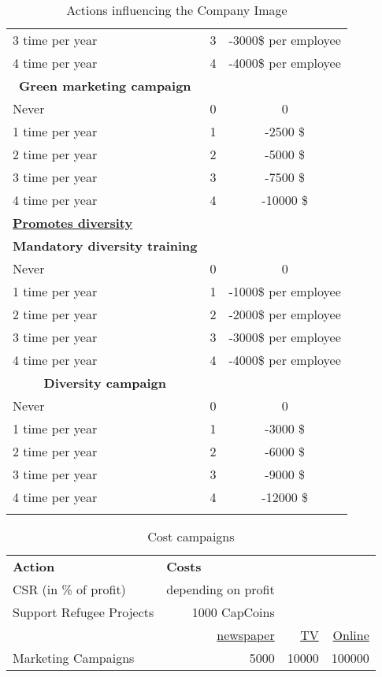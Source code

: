 \begin{longtable}[]{l|c|c}
     3 time per year & 3 & -3000\$ per employee  \\
     4 time per year & 4 & -4000\$ per employee  \\
     \multicolumn{1}{c|}{\textbf{Green marketing campaign}} & & \\
     Never & 0 & 0 \\
     1 time per year & 1 & -2500 \$  \\
     2 time per year & 2 & -5000 \$  \\
     3 time per year & 3 & -7500 \$  \\
     4 time per year & 4 & -10000 \$  \\
     \hline \hline
     \underline{\textbf{Promotes diversity}} & & \\ [1ex]
     \multicolumn{1}{c|}{\textbf{Mandatory diversity training}} & & \\
     Never & 0 & 0 \\
     1 time per year & 1 & -1000\$ per employee  \\
     2 time per year & 2 & -2000\$ per employee  \\
     3 time per year & 3 & -3000\$ per employee  \\
     4 time per year & 4 & -4000\$ per employee  \\
     \multicolumn{1}{c|}{\textbf{Diversity campaign}} & & \\
     Never & 0 & 0 \\
     1 time per year & 1 & -3000 \$  \\
     2 time per year & 2 & -6000 \$  \\
     3 time per year & 3 & -9000 \$  \\
     4 time per year & 4 & -12000 \$  \\
     \hline 
\caption{Actions influencing the Company Image}
    \label{tab:benefitsCIS}
\end{longtable}


\begin{table}[]
\begin{tabular}{|l|r|r|r|}
\hline
\multicolumn{1}{|l|}{\textbf{Action}} & \multicolumn{1}{l}{\textbf{Costs}} & \multicolumn{1}{l}{} & \multicolumn{1}{l|}{} \\
CSR (in \% of profit)     & depending on profit &       &              \\
Support Refugee Projects  & 1000 CapCoins       &       &              \\
                          & \underline{newspaper} & \underline{TV}    &  \underline{Online}      \\
Marketing Campaigns       & 5000                & 10000 & 100000       \\
\hline
\end{tabular}
\caption{Cost campaigns}
\label{cost_campaigns}
\end{table}

